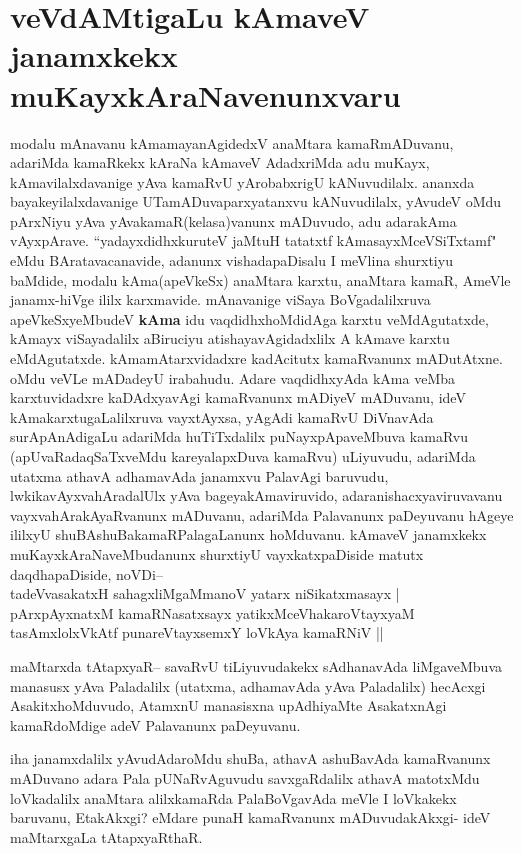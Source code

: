 \section*{veVdAMtigaLu kAmaveV janamxkekx muKayxkAraNavenunxvaru}


\begin{artha}
modalu mAnavanu kAmamayanAgidedxV anaMtara kamaRmADuvanu, adariMda kamaRkekx kAraNa kAmaveV AdadxriMda adu muKayx, kAmavilalxdavanige yAva kamaRvU yArobabxrigU kANuvudilalx. ananxda bayakeyilalxdavanige UTamADuvaparxyatanxvu kANuvudilalx, yAvudeV oMdu pArxNiyu  yAva yAvakamaR(kelasa)vanunx mADuvudo, adu adarakAma vAyxpArave. ``yadayxdidhxkuruteV jaMtuH tatatxtf kAmasayxMceVSiTxtamf" eMdu BAratavacanavide, adanunx vishadapaDisalu I meVlina shurxtiyu baMdide, modalu kAma(apeVkeSx) anaMtara karxtu, anaMtara kamaR, AmeVle janamx-hiVge ililx karxmavide.
mAnavanige viSaya BoVgadalilxruva apeVkeSxyeMbudeV \textbf{kAma} idu vaqdidhxhoMdidAga karxtu veMdAgutatxde, kAmayx viSayadalilx aBiruciyu atishayavAgidadxlilx A kAmave karxtu eMdAgutatxde. kAmamAtarxvidadxre kadAcitutx kamaRvanunx mADutAtxne. oMdu veVLe  mADadeyU irabahudu. Adare vaqdidhxyAda kAma veMba karxtuvidadxre kaDAdxyavAgi kamaRvanunx mADiyeV mADuvanu, ideV kAmakarxtugaLalilxruva vayxtAyxsa, yAgAdi kamaRvU DiVnavAda surApAnAdigaLu adariMda huTiTxdalilx puNayxpApaveMbuva kamaRvu (apUvaRadaqSaTxveMdu kareyalapxDuva kamaRvu) uLiyuvudu, adariMda utatxma athavA adhamavAda janamxvu PalavAgi baruvudu, lwkikavAyxvahAradalUlx yAva bageyakAmaviruvido, adaranishacxyaviruvavanu vayxvahArakAyaRvanunx mADuvanu, adariMda Palavanunx paDeyuvanu hAgeye ililxyU shuBAshuBakamaRPalagaLanunx hoMduvanu. kAmaveV janamxkekx muKayxkAraNaveMbudanunx shurxtiyU vayxkatxpaDiside matutx daqdhapaDiside, noVDi--\\
tadeVvasakatxH sahagxliMgaMmanoV yatarx niSikatxmasayx |\\
pArxpAyxnatxM kamaRNasatxsayx yatikxMceVhakaroVtayxyaM\\ 
tasAmxlolxVkAtf punareVtayxsemxY loVkAya kamaRNiV ||
\end{artha}

\begin{artha}
maMtarxda tAtapxyaR-- savaRvU tiLiyuvudakekx sAdhanavAda liMgaveMbuva manasusx yAva Paladalilx (utatxma, adhamavAda yAva Paladalilx) hecAcxgi AsakitxhoMduvudo, AtamxnU manasisxna upAdhiyaMte AsakatxnAgi kamaRdoMdige adeV Palavanunx paDeyuvanu.

iha janamxdalilx yAvudAdaroMdu shuBa, athavA ashuBavAda kamaRvanunx mADuvano adara Pala pUNaRvAguvudu savxgaRdalilx athavA matotxMdu loVkadalilx anaMtara alilxkamaRda PalaBoVgavAda meVle I loVkakekx baruvanu, EtakAkxgi? eMdare punaH kamaRvanunx mADuvudakAkxgi- ideV maMtarxgaLa tAtapxyaRthaR.
\end{artha}

